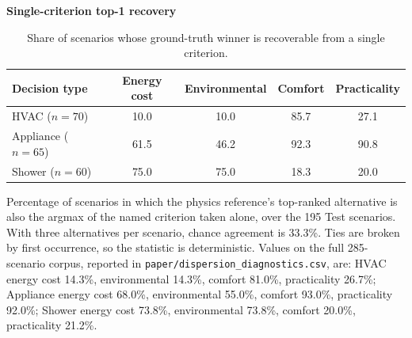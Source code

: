 \begin{table}[htbp]
\begin{threeparttable}
  \footnotesize
  \centering
  \textbf{Single-criterion top-1 recovery}
  \begin{tabular}{lcccc}
    \toprule
    Decision type & Energy cost & Environmental & Comfort & Practicality \\
    \midrule
    HVAC ($n=70$) & 10.0 & 10.0 & 85.7 & 27.1 \\
    Appliance ($n=65$) & 61.5 & 46.2 & 92.3 & 90.8 \\
    Shower ($n=60$) & 75.0 & 75.0 & 18.3 & 20.0 \\
    \bottomrule
  \end{tabular}
  \begin{tablenotes}
    \item Percentage of scenarios in which the physics reference's top-ranked alternative is also the argmax of the named criterion taken alone, over the 195 Test scenarios. With three alternatives per scenario, chance agreement is 33.3\%. Ties are broken by first occurrence, so the statistic is deterministic. Values on the full 285-scenario corpus, reported in \texttt{paper/dispersion\_diagnostics.csv}, are: HVAC energy cost 14.3\%, environmental 14.3\%, comfort 81.0\%, practicality 26.7\%; Appliance energy cost 68.0\%, environmental 55.0\%, comfort 93.0\%, practicality 92.0\%; Shower energy cost 73.8\%, environmental 73.8\%, comfort 20.0\%, practicality 21.2\%.
  \end{tablenotes}
\end{threeparttable}
\caption{Share of scenarios whose ground-truth winner is recoverable from a single criterion.}
\label{tab:single-criterion-recovery}
\end{table}
